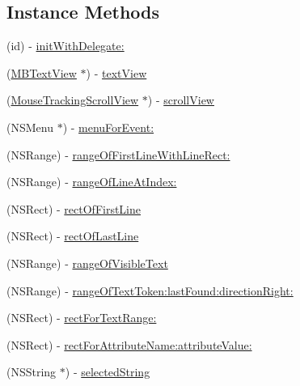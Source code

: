\subsection*{Instance Methods}
\begin{DoxyCompactItemize}
\item 
(id) -\/ \hyperlink{interface_ext_text_view_controller_a31987d71b58e0520588676a4f6896d2c}{init\-With\-Delegate\-:}
\item 
(\hyperlink{interface_m_b_text_view}{M\-B\-Text\-View} $\ast$) -\/ \hyperlink{interface_ext_text_view_controller_ae377a6dfd690bdd8e5662452e8911c19}{text\-View}
\item 
(\hyperlink{interface_mouse_tracking_scroll_view}{Mouse\-Tracking\-Scroll\-View} $\ast$) -\/ \hyperlink{interface_ext_text_view_controller_a951b021a8f12c410233c7d5848b505b2}{scroll\-View}
\item 
(N\-S\-Menu $\ast$) -\/ \hyperlink{interface_ext_text_view_controller_a14434144f47d2ff967d87e42abbff1d8}{menu\-For\-Event\-:}
\item 
(N\-S\-Range) -\/ \hyperlink{interface_ext_text_view_controller_aa29a23961e9c80dcb747e64d4cc8f127}{range\-Of\-First\-Line\-With\-Line\-Rect\-:}
\item 
(N\-S\-Range) -\/ \hyperlink{interface_ext_text_view_controller_aedf800615061dc6ac66fa0f5a92b19a5}{range\-Of\-Line\-At\-Index\-:}
\item 
(N\-S\-Rect) -\/ \hyperlink{interface_ext_text_view_controller_a31efcf5d0da9610defacf8f439ea8abe}{rect\-Of\-First\-Line}
\item 
(N\-S\-Rect) -\/ \hyperlink{interface_ext_text_view_controller_ab96b54468ec5e93d6576b2d25b33ac67}{rect\-Of\-Last\-Line}
\item 
(N\-S\-Range) -\/ \hyperlink{interface_ext_text_view_controller_ae6474f1924eb4bda0c518d9974c76f0e}{range\-Of\-Visible\-Text}
\item 
(N\-S\-Range) -\/ \hyperlink{interface_ext_text_view_controller_a4937bd2e2e0f7f11ad529863d7d50db5}{range\-Of\-Text\-Token\-:last\-Found\-:direction\-Right\-:}
\item 
(N\-S\-Rect) -\/ \hyperlink{interface_ext_text_view_controller_ae4d5de957aa10b45f4171eed7e4e9439}{rect\-For\-Text\-Range\-:}
\item 
(N\-S\-Rect) -\/ \hyperlink{interface_ext_text_view_controller_aa827023a2a76d2a1db4cfd361a3993d9}{rect\-For\-Attribute\-Name\-:attribute\-Value\-:}
\item 
(N\-S\-String $\ast$) -\/ \hyperlink{interface_ext_text_view_controller_ae6856868f469f0349b5d6497396479cc}{selected\-String}

\end{DoxyCompactItemize}
